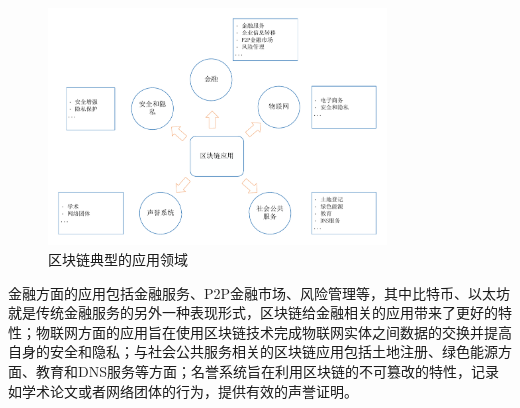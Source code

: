 \begin{figure}[htbp]
 	\centering
 	\includegraphics[width = 0.8\textwidth]{img/applications}
 	\caption{区块链典型的应用领域}\label{fig:applications}
\end{figure}

金融方面的应用包括金融服务、P2P金融市场、风险管理等，其中比特币、以太坊就是传统金融服务的另外一种表现形式，区块链给金融相关的应用带来了更好的特性；物联网方面的应用旨在使用区块链技术完成物联网实体之间数据的交换并提高自身的安全和隐私；与社会公共服务相关的区块链应用包括土地注册、绿色能源方面、教育和DNS服务等方面；名誉系统旨在利用区块链的不可篡改的特性，记录如学术论文或者网络团体的行为，提供有效的声誉证明。





















